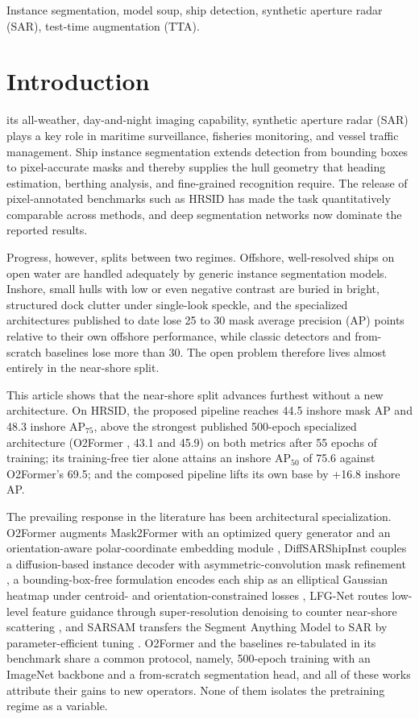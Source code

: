 \begin{IEEEkeywords}
Instance segmentation, model soup, ship detection, synthetic aperture radar (SAR), test-time augmentation (TTA).
\end{IEEEkeywords}

\section{Introduction}
\label{sec:intro}

 its all-weather, day-and-night imaging capability, synthetic aperture radar (SAR) plays a key role in maritime surveillance, fisheries monitoring, and vessel traffic management. Ship instance segmentation extends detection from bounding boxes to pixel-accurate masks and thereby supplies the hull geometry that heading estimation, berthing analysis, and fine-grained recognition require. The release of pixel-annotated benchmarks such as HRSID \cite{hrsid2020} has made the task quantitatively comparable across methods, and deep segmentation networks now dominate the reported results.

Progress, however, splits between two regimes. Offshore, well-resolved ships on open water are handled adequately by generic instance segmentation models. Inshore, small hulls with low or even negative contrast are buried in bright, structured dock clutter under single-look speckle, and the specialized architectures published to date lose 25 to 30 mask average precision (AP) points relative to their own offshore performance, while classic detectors and from-scratch baselines lose more than 30. The open problem therefore lives almost entirely in the near-shore split.

This article shows that the near-shore split advances furthest without a new architecture. On HRSID, the proposed pipeline reaches 44.5 inshore mask AP and 48.3 inshore AP$_{75}$, above the strongest published 500-epoch specialized architecture (O2Former \cite{o2former2025}, 43.1 and 45.9) on both metrics after 55 epochs of training; its training-free tier alone attains an inshore AP$_{50}$ of 75.6 against O2Former's 69.5; and the composed pipeline lifts its own base by +16.8 inshore AP.

The prevailing response in the literature has been architectural specialization. O2Former augments Mask2Former with an optimized query generator and an orientation-aware polar-coordinate embedding module \cite{o2former2025}, DiffSARShipInst couples a diffusion-based instance decoder with asymmetric-convolution mask refinement \cite{diffsar2025}, a bounding-box-free formulation encodes each ship as an elliptical Gaussian heatmap under centroid- and orientation-constrained losses \cite{gaussheatmap2024}, LFG-Net routes low-level feature guidance through super-resolution denoising to counter near-shore scattering \cite{lfgnet2022}, and SARSAM transfers the Segment Anything Model to SAR by parameter-efficient tuning \cite{sarsam2025}. O2Former and the baselines re-tabulated in its benchmark share a common protocol, namely, 500-epoch training with an ImageNet backbone and a from-scratch segmentation head, and all of these works attribute their gains to new operators. None of them isolates the pretraining regime as a variable.

